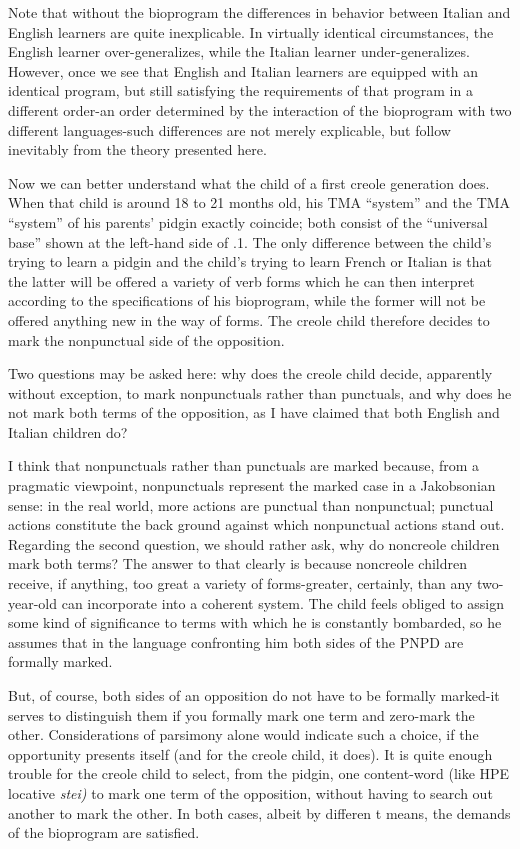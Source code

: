 Note that without the bioprogram the differences in behavior between Italian and English learners are quite inexplicable. In virtually identical circumstances, the English learner over-generalizes, while the Italian learner under-generalizes. However, once we see that English and Italian learners are equipped with an identical program, but still satisfying the requirements of that program in a different order-an order determined by the interaction of the bioprogram with two different languages-such differences are not merely explicable, but follow inevitably from the theory presented here.

Now we can better understand what the child of a first creole generation does. When that child is around 18 to 21 months old, his TMA ``system'' and the TMA ``system'' of his parents' pidgin exactly coincide; both consist of the ``universal base'' shown at the left-hand side of .1. The only difference between the child's trying to learn a pidgin and the child's trying to learn French or Italian is that the latter will be offered a variety of verb forms which he can then interpret according to the specifications of his bioprogram, while the former will not be offered anything new in the way of forms. The creole child therefore decides to mark the nonpunctual side of the opposition.

Two questions may be asked here: why does the creole child decide, apparently without exception, to mark nonpunctuals rather than punctuals, and why does he not mark both terms of the opposi\-tion, as I have claimed that both English and Italian children do?

I think that nonpunctuals rather than punctuals are marked because, from a pragmatic viewpoint, nonpunctuals represent the marked case in a Jakobsonian sense: in the real world, more actions are punctual than nonpunctual; punctual actions constitute the back%
ground against which nonpunctual actions stand out. Regarding the second question, we should rather ask, why do noncreole children mark both terms? The answer to that clearly is because noncreole children receive, if anything, too great a variety of forms-greater, certainly, than any two-year-old can incorporate into a coherent system. The child feels obliged to assign some kind of significance to terms with which he is constantly bombarded, so he assumes that in the language confronting him both sides of the PNPD are formally marked.

But, of course, both sides of an opposition do not have to be formally marked-it serves to distinguish them if you formally mark one term and zero-mark the other. Considerations of parsimony alone would indicate such a choice, if the opportunity presents itself (and for the creole child, it does). It is quite enough trouble for the creole child
to select, from the pidgin, one content-word (like HPE locative \textit{stei)}
to mark one term of the opposition, without having to search out another to mark the other. In both cases, albeit by differen t means, the demands of the bioprogram are satisfied.

